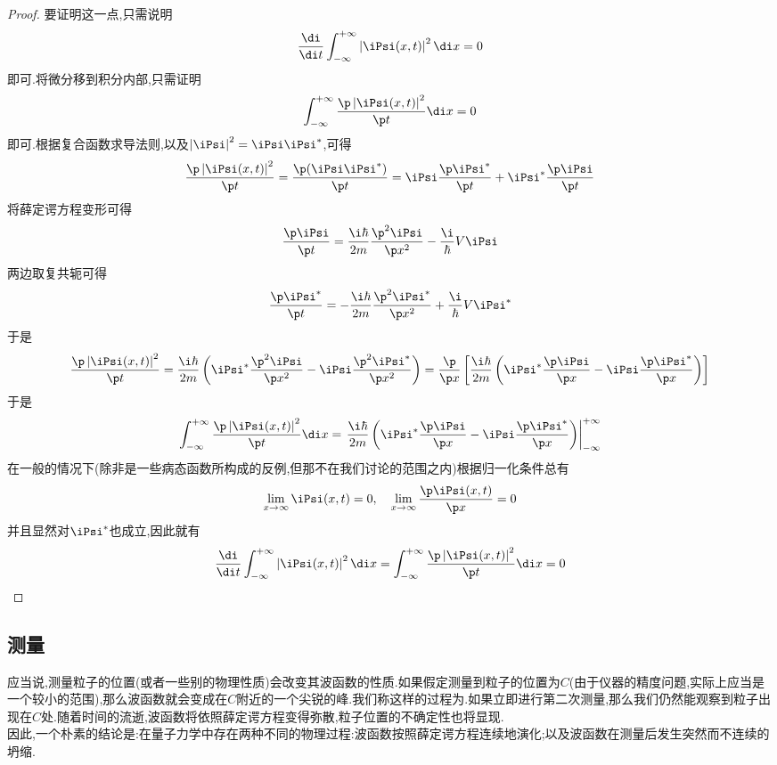 \documentclass{ctexart}
\begin{document}
\begin{proof}
    要证明这一点,只需说明
    \[\dfrac{\di}{\di t}\int_{-\infty}^{+\infty}\left|\iPsi(x,t)\right|^2\di x=0\]
    即可.将微分移到积分内部,只需证明
    \[\int_{-\infty}^{+\infty}\dfrac{\p\left|\iPsi(x,t)\right|^2}{\p t}\di x=0\]
    即可.根据复合函数求导法则,以及$\left|\iPsi\right|^2=\iPsi\iPsi^\ast$,可得
    \[\dfrac{\p\left|\iPsi(x,t)\right|^2}{\p t}=\dfrac{\p(\iPsi\iPsi^\ast)}{\p t}=\iPsi\dfrac{\p\iPsi^\ast}{\p t}+\iPsi^\ast\dfrac{\p\iPsi}{\p t}\]
    将薛定谔方程变形可得
    \[\dfrac{\p\iPsi}{\p t}=\dfrac{\i\hbar}{2m}\dfrac{\p^2\iPsi}{\p x^2}-\dfrac{\i}{\hbar}V\iPsi\]
    两边取复共轭可得
    \[\dfrac{\p\iPsi^\ast}{\p t}=-\dfrac{\i\hbar}{2m}\dfrac{\p^2\iPsi^\ast}{\p x^2}+\dfrac{\i}{\hbar}V\iPsi^\ast\]
    于是
    \[\dfrac{\p\left|\iPsi(x,t)\right|^2}{\p t}=\dfrac{\i\hbar}{2m}\left(\iPsi^\ast\dfrac{\p^2\iPsi}{\p x^2}-\iPsi\dfrac{\p^2\iPsi^\ast}{\p x^2}\right)=\dfrac{\p}{\p x}\left[\dfrac{\i\hbar}{2m}\left(\iPsi^\ast\dfrac{\p\iPsi}{\p x}-\iPsi\dfrac{\p\iPsi^\ast}{\p x}\right)\right]\]
    于是
    \[\int_{-\infty}^{+\infty}\dfrac{\p\left|\iPsi(x,t)\right|^2}{\p t}\di x=\left.\dfrac{\i\hbar}{2m}\left(\iPsi^\ast\dfrac{\p\iPsi}{\p x}-\iPsi\dfrac{\p\iPsi^\ast}{\p x}\right)\right|_{-\infty}^{+\infty}\]
    在一般的情况下(除非是一些病态函数所构成的反例,但那不在我们讨论的范围之内)根据归一化条件总有
    \[\lim_{x\to\infty}\iPsi(x,t)=0,\quad\lim_{x\to\infty}\dfrac{\p\iPsi(x,t)}{\p x}=0\]
    并且显然对$\iPsi^\ast$也成立,因此就有
    \[\dfrac{\di}{\di t}\int_{-\infty}^{+\infty}\left|\iPsi(x,t)\right|^2\di x=\int_{-\infty}^{+\infty}\dfrac{\p\left|\iPsi(x,t)\right|^2}{\p t}\di x=0\]
\end{proof}
\subsection{测量}
应当说,测量粒子的位置(或者一些别的物理性质)会改变其波函数的性质.如果假定测量到粒子的位置为$C$(由于仪器的精度问题,实际上应当是一个较小的范围),那么波函数就会变成在$C$附近的一个尖锐的峰.我们称这样的过程为.如果立即进行第二次测量,那么我们仍然能观察到粒子出现在$C$处.随着时间的流逝,波函数将依照薛定谔方程变得弥散,粒子位置的不确定性也将显现.\\
\indent 因此,一个朴素的结论是:在量子力学中存在两种不同的物理过程:波函数按照薛定谔方程连续地演化;以及波函数在测量后发生突然而不连续的坍缩.
\end{document}
